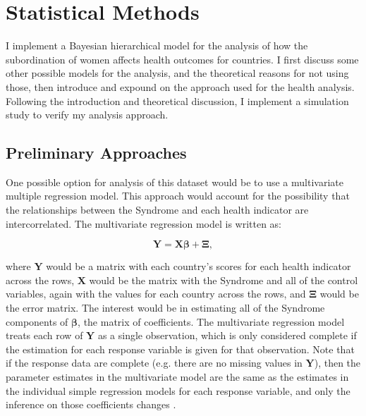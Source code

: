 \chapter{Statistical Methods}

I implement a Bayesian hierarchical model for the analysis of how the subordination of women affects health outcomes for countries. I first discuss some other possible models for the analysis, and the theoretical reasons for not using those, then introduce and expound on the approach used for the health analysis. Following the introduction and theoretical discussion, I implement a simulation study to verify my analysis approach. 

\section{Preliminary Approaches} \label{prelim}

One possible option for analysis of this dataset would be to use a multivariate multiple regression model. This approach would account for the possibility that the relationships between the Syndrome and each health indicator are intercorrelated. The multivariate regression model is written as: 

\begin{equation}
\mathbf{Y} = \mathbf{X}\boldsymbol{\beta} + \boldsymbol{\Xi},
\end{equation}

where $\mathbf{Y}$ would be a matrix with each country's scores for each health indicator across the rows, $\mathbf{X}$ would be the matrix with the Syndrome and all of the control variables, again with the values for each country across the rows, and $\boldsymbol{\Xi}$ would be the error matrix. The interest would be in estimating all of the Syndrome components of $\boldsymbol{\beta}$, the matrix of coefficients. The multivariate regression model treats each row of $\mathbf{Y}$ as a single observation, which is only considered complete if the estimation for each response variable is given for that observation. Note that if the response data are complete (e.g. there are no missing values in $\mathbf{Y}$), then the parameter estimates in the multivariate model are the same as the estimates in the individual simple regression models for each response variable, and only the inference on those coefficients changes \citep{Rencher}.

